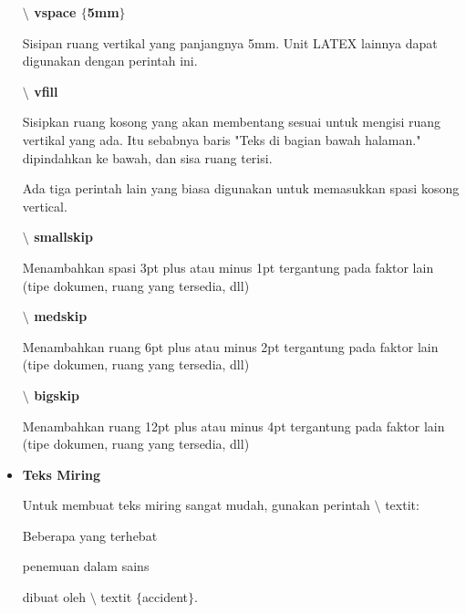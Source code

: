 \begin{itemize}
\textbf{$\setminus$ vspace $ \{ $5mm$ \} $}\par

Sisipan ruang vertikal yang panjangnya 5mm. Unit LATEX lainnya dapat digunakan dengan perintah ini.\par

\textbf{$\setminus$ vfill}\par

Sisipkan ruang kosong yang akan membentang sesuai untuk mengisi ruang vertikal yang ada. Itu sebabnya baris "Teks di bagian bawah halaman." dipindahkan ke bawah, dan sisa ruang terisi.\par

Ada tiga perintah lain yang biasa digunakan untuk memasukkan spasi kosong vertical.\par

\textbf{$\setminus$ smallskip}\par

Menambahkan spasi 3pt plus atau minus 1pt tergantung pada faktor lain (tipe dokumen, ruang yang tersedia, dll)\par

\textbf{$\setminus$ medskip}\par

Menambahkan ruang 6pt plus atau minus 2pt tergantung pada faktor lain (tipe dokumen, ruang yang tersedia, dll)\par

\textbf{$\setminus$ bigskip}\par

Menambahkan ruang 12pt plus atau minus 4pt tergantung pada faktor lain (tipe dokumen, ruang yang tersedia, dll)\par

\vspace{10pt}
	\item {\fontsize{14pt}{14pt}\selectfont \textbf{Teks Miring}}\par

Untuk membuat teks miring sangat mudah, gunakan perintah $\setminus$ textit:\par

\hspace*{0.5in}Beberapa yang terhebat\par

\hspace*{0.5in}penemuan dalam sains\par

\hspace*{0.5in}dibuat oleh $\setminus$ textit $ \{ $accident$ \} $.\par


\end{itemize}
